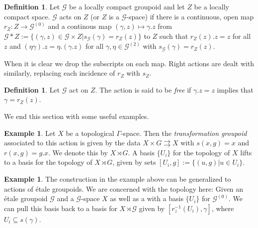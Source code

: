 \documentclass[11pt]{amsart}
\theoremstyle{plain}
\theoremstyle{definition}%
\newtheorem{definition}[theorem]{Definition}%
\newtheorem{example}[theorem]{Example}%
\theoremstyle{remark}%
\newcommand{\G}{\mathcal{G}}
\begin{document}
\begin{definition}
Let $\G$ be a locally compact groupoid and let $Z$ be a locally compact space. $\G$ acts on $Z$ (or $Z$ is a $\G$-space) if there is a continuous, open map $r_{Z}: Z \rightarrow \G^{(0)}$ and a continous map $(\gamma, z) \mapsto \gamma .z$ from $\G \ast Z:= \lbrace (\gamma, z) \in \G \times Z | s_{\G}(\gamma)=r_{Z}(z)\rbrace$ to $Z$ such that $r_{Z}(z).z=z$ for all $z$ and $(\eta \gamma).z= \eta.(\gamma. z)$ for all $\gamma, \eta \in \G^{(2)}$ with $s_{\G}(\gamma)=r_{Z}(z)$.
\end{definition}

When it is clear we drop the subscripts on each map. Right actions are dealt with similarly, replacing each incidence of $r_{Z}$ with $s_{Z}$.

\begin{definition}
Let $\G$ act on $Z$. The action is said to be \textit{free} if $\gamma.z=z$ implies that $\gamma = r_{Z}(z)$.
\end{definition}
We end this section with some useful examples.

\begin{example}\label{Ex:TransGrp}
Let $X$ be a topological $\Gamma$-space. Then the \textit{transformation groupoid} associated to this action is given by the data $X \times G \rightrightarrows X$ with $s(x,g)=x$ and $r(x,g)=g.x$. We denote this by $X \rtimes G$. A basis $\lbrace U_{i} \rbrace$ for the topology of $X$ lifts to a basis for the topology of $X \rtimes G$, given by sets $[U_{i},g]:=\lbrace (u,g) | u \in U_{i} \rbrace$. 
\end{example}

\begin{example}
The construction in the example above can be generalized to actions of \'etale groupoids. We are concerned with the topology here: Given an \'etale groupoid $\G$ and a $\G$-space $X$ as well as a with a basis $\lbrace U_{i} \rbrace$ for $\G^{(0)}$. We can pull this basis back to a basis for $X \rtimes \G$ given by $[r_{z}^{-1}(U_{i}),\gamma]$, where $U_{i} \subseteq s(\gamma)$.
\end{example}
\end{document}
